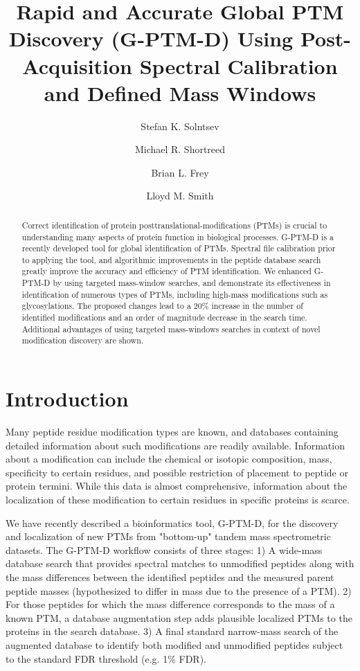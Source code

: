 \documentclass[journal=jprobs,manuscript=article]{achemso}
\author{Stefan K. Solntsev}
\author{Michael R. Shortreed}
\author{Brian L. Frey}
\author{Lloyd M. Smith}
\affiliation[UwMadison]
{University of Wisconsin-Madison}
\title[Rapid and Accurate Global PTM Discovery (G-PTM-D) Using Post-Acquisition Spectral Calibration and Defined Mass Windows]
  {Rapid and Accurate Global PTM Discovery (G-PTM-D) Using Post-Acquisition Spectral Calibration and Defined Mass Windows}
\begin{document}
\begin{abstract}

Correct identification of protein posttranslational-modifications (PTMs) is crucial to understanding many aspects of protein function in biological processes.
G-PTM-D\cite{Li_2016} is a recently developed tool for global identification of PTMs.
Spectral file calibration prior to applying the tool, and algorithmic improvements in the peptide database search greatly improve the accuracy and efficiency of PTM identification.
We enhanced G-PTM-D by using targeted mass-window searches, and demonstrate its effectiveness in identification of numerous types of PTMs, including high-mass modifications such as glycosylations.
The proposed changes lead to a 20\% increase in the number of identified modifications and an order of magnitude decrease in the search time.
Additional advantages of using targeted mass-windows searches in context of novel modification discovery are shown.
\end{abstract}

\section{Introduction}

Many peptide residue modification types are known, and databases containing detailed information about such modifications are readily available.
Information about a modification can include the chemical or isotopic composition, mass, specificity to certain residues, and possible restriction of placement to peptide or protein termini.
While this data is almost comprehensive, information about the localization of these modification to certain residues in specific proteins is scarce.

We have recently described a bioinformatics tool, G-PTM-D, for the discovery and localization of new PTMs from "bottom-up" tandem mass spectrometric datasets\cite{Li_2016}.
The G-PTM-D workflow consists of three stages: 1) A wide-mass database search\cite{Chick_2015,Na_2011} that provides spectral matches to unmodified peptides along with the mass differences between the identified peptides and the measured parent peptide masses (hypothesized to differ in mass due to the presence of a PTM). 
2) For those peptides for which the mass difference corresponds to the mass of a known PTM, a database augmentation step adds plausible localized PTMs to the proteins in the search database.
3) A final standard narrow-mass search of the augmented database to identify both modified and unmodified peptides subject to the standard FDR threshold (e.g. 1\% FDR).
\end{document}
